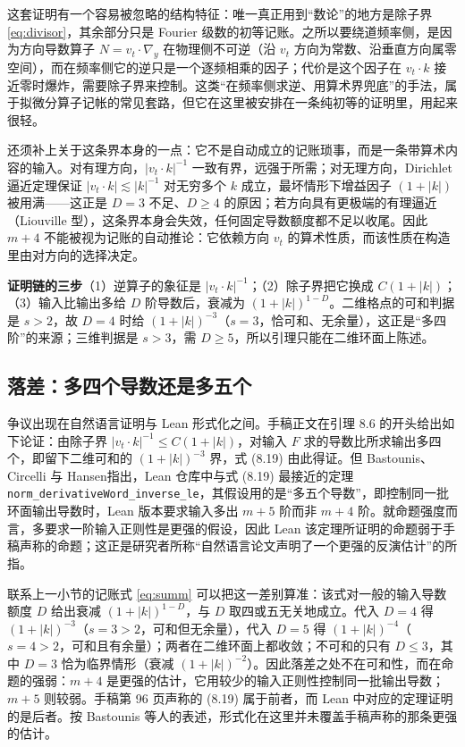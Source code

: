 \begin{remark}
这套证明有一个容易被忽略的结构特征：唯一真正用到“数论”的地方是除子界 \eqref{eq:divisor}，其余部分只是 Fourier 级数的初等记账。之所以要绕道频率侧，是因为方向导数算子 $N=v_{t}\cdot\nabla_{y}$ 在物理侧不可逆（沿 $v_{t}$ 方向为常数、沿垂直方向属零空间），而在频率侧它的逆只是一个逐频相乘的因子；代价是这个因子在 $v_{t}\cdot k$ 接近零时爆炸，需要除子界来控制。这类“在频率侧求逆、用算术界兜底”的手法，属于拟微分算子记帐的常见套路，但它在这里被安排在一条纯初等的证明里，用起来很轻。

还须补上关于这条界本身的一点：它不是自动成立的记账琐事，而是一条带算术内容的输入。对有理方向，$|v_{t}\cdot k|^{-1}$ 一致有界，远强于所需；对无理方向，Dirichlet 逼近定理保证 $|v_{t}\cdot k|\lesssim|k|^{-1}$ 对无穷多个 $k$ 成立，最坏情形下增益因子 $(1+|k|)$ 被用满——这正是 $D=3$ 不足、$D\ge4$ 的原因；若方向具有更极端的有理逼近（Liouville 型），这条界本身会失效，任何固定导数额度都不足以收尾。因此 $m+4$ 不能被视为记账的自动推论：它依赖方向 $v_{t}$ 的算术性质，而该性质在构造里由对方向的选择决定。
\end{remark}

\begin{keybox}
\textbf{证明链的三步}\quad （1）逆算子的象征是 $|v_{t}\cdot k|^{-1}$；（2）除子界把它换成 $C(1+|k|)$；（3）输入比输出多给 $D$ 阶导数后，衰减为 $(1+|k|)^{1-D}$。二维格点的可和判据是 $s>2$，故 $D=4$ 时给 $(1+|k|)^{-3}$（$s=3$，恰可和、无余量），这正是“多四阶”的来源；三维判据是 $s>3$，需 $D\ge5$，所以引理只能在二维环面上陈述。
\end{keybox}

\subsection{落差：多四个导数还是多五个}

争议出现在自然语言证明与 Lean 形式化之间。手稿正文在引理 8.6 的开头给出如下论证：由除子界 $|v_{t}\cdot k|^{-1}\le C(1+|k|)$，对输入 $F$ 求的导数比所求输出多四个，即留下二维可和的 $(1+|k|)^{-3}$ 界，式 (8.19) 由此得证。但 Bastounis、Circelli 与 Hansen\cite{bch}指出，Lean 仓库中与式 (8.19) 最接近的定理 \texttt{norm\_derivativeWord\_inverse\_le}，其假设用的是“多五个导数”，即控制同一批环面输出导数时，Lean 版本要求输入多出 $m+5$ 阶而非 $m+4$ 阶。就命题强度而言，多要求一阶输入正则性是更强的假设，因此 Lean 该定理所证明的命题弱于手稿声称的命题；这正是研究者所称“自然语言论文声明了一个更强的反演估计”的所指。

联系上一小节的记账式 \eqref{eq:summ} 可以把这一差别算准：该式对一般的输入导数额度 $D$ 给出衰减 $(1+|k|)^{1-D}$，与 $D$ 取四或五无关地成立。代入 $D=4$ 得 $(1+|k|)^{-3}$（$s=3>2$，可和但无余量），代入 $D=5$ 得 $(1+|k|)^{-4}$（$s=4>2$，可和且有余量）；两者在二维环面上都收敛；不可和的只有 $D\le3$，其中 $D=3$ 恰为临界情形（衰减 $(1+|k|)^{-2}$）。因此落差之处不在可和性，而在命题的强弱：$m+4$ 是更强的估计，它用较少的输入正则性控制同一批输出导数；$m+5$ 则较弱。手稿第 96 页声称的 (8.19) 属于前者，而 Lean 中对应的定理证明的是后者。按 Bastounis 等人的表述，形式化在这里并未覆盖手稿声称的那条更强的估计。


